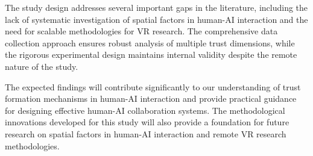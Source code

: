 \documentclass[12pt]{article}
\begin{document}
The study design addresses several important gaps in the literature, including the lack of systematic investigation of spatial factors in human-AI interaction and the need for scalable methodologies for VR research. The comprehensive data collection approach ensures robust analysis of multiple trust dimensions, while the rigorous experimental design maintains internal validity despite the remote nature of the study.

The expected findings will contribute significantly to our understanding of trust formation mechanisms in human-AI interaction and provide practical guidance for designing effective human-AI collaboration systems. The methodological innovations developed for this study will also provide a foundation for future research on spatial factors in human-AI interaction and remote VR research methodologies.
\end{document}
